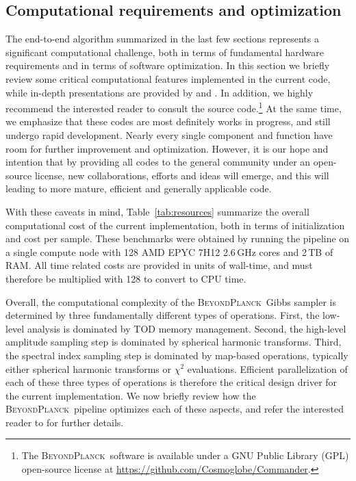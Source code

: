\documentclass[onecolumn]{aa}
\newcommand{\BP}{\textsc{BeyondPlanck}}
\begin{document}
\subsection{Computational requirements and optimization}
\label{sec:compcost}


The end-to-end algorithm summarized in the last few sections
represents a significant computational challenge, both in terms of
fundamental hardware requirements and in terms of software
optimization. In this section we briefly review some critical
computational features implemented in the current code, while in-depth
presentations are provided by \citet{bp03} and \citet{bp05}. In
addition, we highly recommend the interested reader to consult the
source code.\footnote{The \BP\ software is available under a GNU
  Public Library (GPL) open-source license at
  \url{https://github.com/Cosmoglobe/Commander}.} At the same time, we
emphasize that these codes are most definitely works in progress, and
still undergo rapid development. Nearly every single component and
function have room for further improvement and optimization. However,
it is our hope and intention that by providing all codes to the
general community under an open-source license, new collaborations,
efforts and ideas will emerge, and this will leading to more mature,
efficient and generally applicable code.

With these caveats in mind, Table~\ref{tab:resources} summarize the
overall computational cost of the current implementation, both in
terms of initialization and cost per sample. These benchmarks were
obtained by running the pipeline on a single compute node with 128
AMD EPYC 7H12 2.6\,GHz cores and 2\,TB of RAM. All time
related costs are provided in units of wall-time, and must therefore
be multiplied with 128 to convert to CPU time.

Overall, the computational complexity of the \BP\ Gibbs sampler is
determined by three fundamentally different types of
operations. First, the low-level analysis is dominated by TOD memory
management. Second, the high-level amplitude sampling step is
dominated by spherical harmonic transforms. Third, the spectral index
sampling step is dominated by map-based operations, typically either
spherical harmonic transforms or $\chi^2$ evaluations. Efficient
parallelization of each of these three types of operations is
therefore the critical design driver for the current implementation. We
now briefly review how the \BP\ pipeline optimizes each of these
aspects, and refer the interested reader to \citet{bp03} for further
details.
\end{document}
